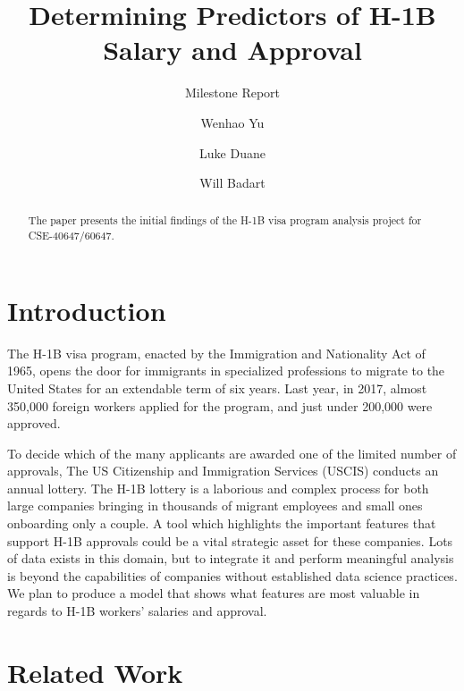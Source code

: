 \documentclass[sigconf]{acmart}
\begin{document}
\title{Determining Predictors of H-1B Salary and Approval}
\subtitle{Milestone Report}


\author{Wenhao Yu}

\author{Luke Duane}

\author{Will Badart}


\begin{abstract}
The paper presents the initial findings of the H-1B visa program analysis
project for CSE-40647/60647.
\end{abstract}

\maketitle


\section{Introduction}

The H-1B visa program, enacted by the Immigration and Nationality Act of 1965, opens the door for
immigrants in specialized professions to migrate to the United States for an extendable term of six
years. Last year, in 2017, almost 350,000 foreign workers applied for the program, and just under
200,000 were approved.

To decide which of the many applicants are awarded one of the limited number of approvals, The US
Citizenship and Immigration Services (USCIS) conducts an annual lottery. The H-1B lottery is a
laborious and complex process for both large companies bringing in thousands of migrant employees
and small ones onboarding only a couple. A tool which highlights the important features that support
H-1B approvals could be a vital strategic asset for these companies. Lots of data exists in this
domain, but to integrate it and perform meaningful analysis is beyond the capabilities of companies
without established data science practices. We plan to produce a model that shows what features are
most valuable in regards to H-1B workers’ salaries and approval.


\section{Related Work}
\end{document}
